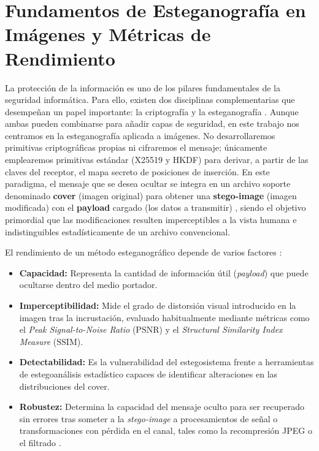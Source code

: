 \documentclass[IB]{TFUOC}%
\begin{document}
\section{Fundamentos de Esteganografía en Imágenes y Métricas de Rendimiento}

La protección de la información es uno de los pilares fundamentales de la seguridad informática. Para ello, existen dos disciplinas complementarias que desempeñan un papel importante: la criptografía y la esteganografía \cite{13}. Aunque ambas pueden combinarse para añadir capas de seguridad, en este trabajo nos centramos en la esteganografía aplicada a imágenes. No desarrollaremos primitivas criptográficas propias ni cifraremos el mensaje; únicamente emplearemos primitivas estándar (X25519 y HKDF) para derivar, a partir de las claves del receptor, el mapa secreto de posiciones de inserción. En este paradigma, el mensaje que se desea ocultar se integra en un archivo soporte denominado \textbf{cover} (imagen original) para obtener una \textbf{stego-image} (imagen modificada) con el \textbf{payload} cargado (los datos a transmitir) \cite{3}, siendo el objetivo primordial que las modificaciones resulten imperceptibles a la vista humana e indistinguibles estadísticamente de un archivo convencional.

El rendimiento de un método esteganográfico depende de varios factores \cite{11,3}:

\begin{itemize}
    \item \textbf{Capacidad:} Representa la cantidad de información útil (\textit{payload}) que puede ocultarse dentro del medio portador.
    \item \textbf{Imperceptibilidad:} Mide el grado de distorsión visual introducido en la imagen tras la incrustación, evaluado habitualmente mediante métricas como el \textit{Peak Signal-to-Noise Ratio} ($\mathrm{PSNR}$) y el \textit{Structural Similarity Index Measure} ($\mathrm{SSIM}$).
    \item \textbf{Detectabilidad:} Es la vulnerabilidad del estegosistema frente a herramientas de estegoanálisis estadístico capaces de identificar alteraciones en las distribuciones del cover.
    \item \textbf{Robustez:} Determina la capacidad del mensaje oculto para ser recuperado sin errores tras someter a la \textit{stego-image} a procesamientos de señal o transformaciones con pérdida en el canal, tales como la recompresión JPEG o el filtrado \cite{16}.
\end{itemize}
\end{document}
